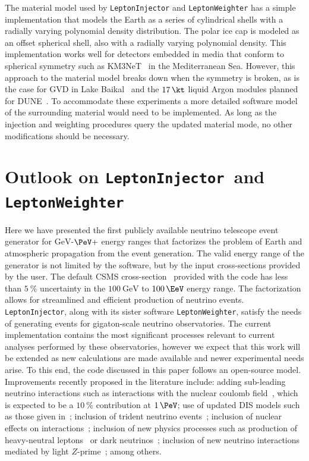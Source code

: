 \documentclass[main.tex]{subfiles}
\newcommand{\LeptonInjector}{\texttt{LeptonInjector}}
\newcommand{\LeptonWeighter}{\texttt{LeptonWeighter}}
\begin{document}
The material model used by \LeptonInjector{} and \LeptonWeighter{} has a simple implementation that models the Earth as a series of cylindrical shells with a radially varying polynomial density distribution.
The polar ice cap is modeled as an offset spherical shell, also with a radially varying polynomial density.
This implementation works well for detectors embedded in media that conform to spherical symmetry such as KM3NeT~\cite{Adrian-Martinez:2016fdl} in the Mediterranean Sea.
However, this approach to the material model breaks down when the symmetry is broken, as is the case for GVD in Lake Baikal~\cite{Avrorin:2018ijk} and the $\SI{17}\kt$ liquid Argon modules planned for DUNE~\cite{Abi:2020loh}.
To accommodate these experiments a more detailed software model of the surrounding material would need to be implemented.
As long as the injection and weighting procedures query the updated material mode, no other modifications should be necessary.

\section{Outlook on \LeptonInjector~and \LeptonWeighter \label{sec:li_conclusions}}

Here we have presented the first publicly available neutrino telescope event generator for $\si\GeV$-$\si\PeV+$ energy ranges that factorizes the problem of Earth and atmospheric propagation from the event generation.
The valid energy range of the generator is not limited by the software, but by the input cross-sections provided by the user. 
The default CSMS cross-section~\cite{CooperSarkar:2011pa} provided with the code has less than $\SI{5}\percent$ uncertainty in the $\SI{100}\GeV$ to $\SI{100}\EeV$ energy range.
The factorization allows for streamlined and efficient production of neutrino events. 
\LeptonInjector{}, along with its sister software \LeptonWeighter{}, satisfy the needs of generating events for gigaton-scale neutrino observatories.
The current implementation contains the most significant processes relevant to current analyses performed by these observatories, however we expect that this work will be extended as new calculations are made available and newer experimental needs arise.
To this end, the code discussed in this paper follows an open-source model. 
Improvements recently proposed in the literature include: adding sub-leading neutrino interactions such as interactions with the nuclear coulomb field~\cite{Seckel:1997kk,Alikhanov:2014uja,Zhou:2019vxt,Beacom:2019pzs}, which is expected to be a $\SI{10}\percent$ contribution at $\SI{1}\PeV$; use of updated DIS models such as those given in~\cite{Garcia:2020jwr}; inclusion of trident neutrino events~\cite{Altmannshofer:2014pba,Ge:2017poy,Ballett:2018uuc,Altmannshofer:2019zhy,Beacom:2019pzs}; inclusion of nuclear effects on interactions~\cite{Bertone:2018dse}; inclusion of new physics processes such as production of heavy-neutral leptons~\cite{PhysRevLett.119.201804,Magill:2018jla,Cline:2020mdt} or dark neutrinos~\cite{Bertuzzo:2018itn,Blennow:2019fhy,Ballett:2019cqp,Coloma:2019qqj,Abdullahi:2020nyr}; inclusion of new neutrino interactions mediated by light $Z$-prime~\cite{Cherry:2016jol,Bakhti:2018avv,Ballett:2019xoj}; among others.
\end{document}
